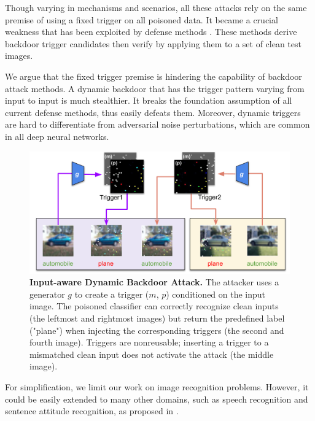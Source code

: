 \documentclass{article}
\begin{document}
Though varying in mechanisms and scenarios, all these attacks rely on the same premise of using a fixed trigger on all poisoned data. It became a crucial weakness that has been exploited by defense methods \cite{wang2019neural,liu2019abs,gao2019strip,udeshi2019model}. These methods derive backdoor trigger candidates then verify by applying them to a set of clean test images.

We argue that the fixed trigger premise is hindering the capability of backdoor attack methods. A dynamic backdoor that has the trigger pattern varying from input to input is much stealthier. It breaks the foundation assumption of all current defense methods, thus easily defeats them. Moreover, dynamic triggers are hard to differentiate from adversarial noise perturbations, which are common in all deep neural networks.
\begin{center}
    \begin{figure}[t]
    \begin{center}
     \includegraphics[scale=0.54]{figures/Teaser-crop.pdf}
    \end{center}
    \caption{\textbf{Input-aware Dynamic Backdoor Attack.} The attacker uses a generator $g$ to create a trigger ($m$, $p$) conditioned on the input image. The poisoned classifier can correctly recognize clean inputs (the leftmost and rightmost images) but return the predefined label ("plane") when injecting the corresponding triggers (the second and fourth image). Triggers are nonreusable; inserting a trigger to a mismatched clean input does not activate the attack (the middle image).}
    \label{fig:teaser}
    \end{figure}
    \vspace{-2mm}
\end{center}

For simplification, we limit our work on image recognition problems. However, it could be easily extended to many other domains, such as speech recognition and sentence attitude recognition, as proposed in \cite{liu2017trojaning}.
\end{document}
